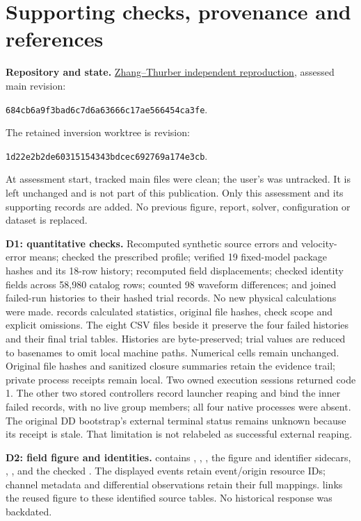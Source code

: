 \documentclass[10pt,letterpaper]{article}
\newcommand{\repo}{https://github.com/nts345045/zhang-thurber-2003-independent-reproduction}
\begin{document}
\clearpage
\appendix

\section{Supporting checks, provenance and references}
\textbf{Repository and state.}
\href{\repo}{Zhang--Thurber independent reproduction}, assessed main revision:\par
\texttt{684cb6a9f3bad6c7d6a63666c17ae566454ca3fe}.\par
The retained inversion worktree is revision:\par
\texttt{1d22e2b2de60315154343bdcec692769a174e3cb}.\par
At assessment start, tracked main files were clean; the user's
 was untracked. It is left unchanged and is not part of this publication.
Only this assessment and its supporting records are added. No previous figure,
report, solver, configuration or dataset is replaced.

\textbf{D1: quantitative checks.}
Recomputed synthetic source errors and velocity-error means; checked the
prescribed profile; verified 19 fixed-model package hashes and its 18-row
history; recomputed field displacements; checked identity fields across
58,980 catalog rows; counted 98 waveform differences; and joined failed-run
histories to their hashed trial records. No new physical calculations were made.
 records calculated
statistics, original file hashes, check scope and explicit omissions.
The eight CSV files beside it preserve the four failed histories and their final
trial tables. Histories are byte-preserved; trial  values
are reduced to basenames to omit local machine paths. Numerical cells remain
unchanged. Original file hashes and sanitized closure summaries retain the
evidence trail; private process receipts remain local.
Two owned execution sessions returned code 1. The other two stored controllers
record launcher reaping and bind the inner failed records, with no live group
members; all four native processes were absent. The original DD bootstrap's
external terminal status remains unknown because its receipt is stale.
That limitation is not relabeled as successful external reaping.

\textbf{D2: field figure and identities.}
contains , ,
, the figure and identifier sidecars,
, , and the checked
. The displayed events retain event/origin resource IDs;
channel metadata and differential observations retain their full mappings.
 links the reused figure to these
identified source tables. No historical response was backdated.
\end{document}
